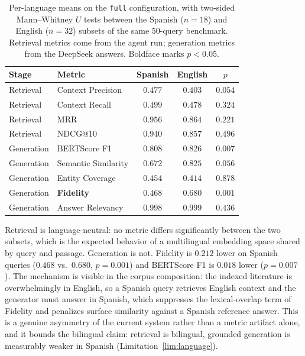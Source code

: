 \documentclass[runningheads]{llncs}
\begin{document}
\begin{table}[!ht]
\centering
\caption{Per-language means on the \texttt{full} configuration, with two-sided
Mann--Whitney $U$ tests between the Spanish ($n{=}18$) and English ($n{=}32$) subsets of
the same 50-query benchmark. Retrieval metrics come from the agent run; generation
metrics from the DeepSeek answers. Boldface marks $p<0.05$.}
\label{tab:language}
\footnotesize
\begin{tabular}{l l c c c}
\toprule
\textbf{Stage} & \textbf{Metric} & \textbf{Spanish} & \textbf{English} & $p$ \\
\midrule
Retrieval  & Context Precision   & $0.477$ & $0.403$ & $0.054$ \\
Retrieval  & Context Recall      & $0.499$ & $0.478$ & $0.324$ \\
Retrieval  & MRR                 & $0.956$ & $0.864$ & $0.221$ \\
Retrieval  & NDCG@10             & $0.940$ & $0.857$ & $0.496$ \\
\midrule
Generation & BERTScore F1        & $0.808$ & $0.826$ & $\mathbf{0.007}$ \\
Generation & Semantic Similarity & $0.672$ & $0.825$ & $0.056$ \\
Generation & Entity Coverage     & $0.454$ & $0.414$ & $0.878$ \\
Generation & \textbf{Fidelity}   & $0.468$ & $0.680$ & $\mathbf{0.001}$ \\
Generation & Answer Relevancy    & $0.998$ & $0.999$ & $0.436$ \\
\bottomrule
\end{tabular}
\end{table}

Retrieval is language-neutral: no metric differs significantly between the two subsets,
which is the expected behavior of a multilingual embedding space shared by query and
passage. Generation is not. Fidelity is $0.212$ lower on Spanish queries
($0.468$ vs.\ $0.680$, $p{=}0.001$) and BERTScore F1 is $0.018$ lower
($p{=}0.007$). The mechanism is visible in the corpus composition: the indexed
literature is overwhelmingly in English, so a Spanish query retrieves English context
and the generator must answer in Spanish, which suppresses the lexical-overlap term of
Fidelity and penalizes surface similarity against a Spanish reference answer. This is a
genuine asymmetry of the current system rather than a metric artifact alone, and it
bounds the bilingual claim: retrieval is bilingual, grounded generation is measurably
weaker in Spanish (Limitation~\ref{lim:language}).
\end{document}
